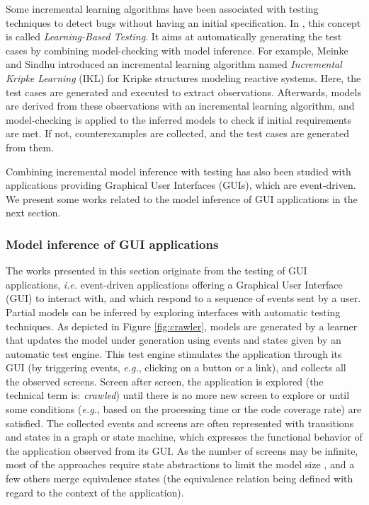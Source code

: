Some incremental learning algorithms have been associated with
testing techniques to detect bugs without having an initial
specification. In \cite{Meinke:2004:ABT:1007512.1007532,tap2011},
this concept is called \textit{Learning-Based Testing}. It aims
at automatically generating the test cases by combining
model-checking with model inference. For example, Meinke and
Sindhu \cite{tap2011} introduced an incremental learning
algorithm named \textit{Incremental Kripke Learning} (IKL) for
Kripke structures modeling reactive systems. Here, the test
cases are generated and executed to extract observations.
Afterwards, models are derived from these observations with an
incremental learning algorithm, and model-checking is applied to
the inferred models to check if initial requirements are met. If
not, counterexamples are collected, and the test cases are
generated from them.

Combining incremental model inference with testing has also been
studied with applications providing Graphical User Interfaces
(GUIs), which are event-driven. We present some works related to
the model inference of GUI applications in the next section.

\subsubsection{Model inference of GUI applications}
\label{sec:active-crawling}

The works presented in this section originate from the testing of
GUI applications, \emph{i.e.} event-driven applications offering a
Graphical User Interface (GUI) to interact with, and which
respond to a sequence of events sent by a user. Partial models
can be inferred by exploring interfaces with automatic testing
techniques. As depicted in Figure \ref{fig:crawler}, models are
generated by a learner that updates the model under generation
using events and states given by an automatic test engine. This
test engine stimulates the application through its GUI (by
triggering events, \emph{e.g.}, clicking on a button or a link), and
collects all the observed screens.  Screen after screen, the
application is explored (the technical term is: \emph{crawled}) until
there is no more new screen to explore or until some conditions
(\emph{e.g.}, based on the processing time or the code coverage rate)
are satisfied. The collected events and screens are often
represented with transitions and states in a graph or state
machine, which expresses the functional behavior of the
application observed from its GUI. As the number of screens may
be infinite, most of the approaches require state abstractions to
limit the model size
\cite{MobiGUITARIEEESoftware2014,guitar,5954416,WPX13,SP15}, and
a few others merge equivalence states
\cite{crawljax:tweb12,4656395} (the equivalence relation being
defined with regard to the context of the application).


